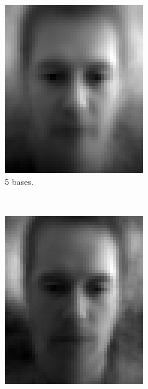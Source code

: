 \documentclass[a4paper, 10pt, conference]{ieeeconf}
\begin{document}
\begin{figure}[!ht]
\begin{subfigure}{0.1\textwidth}
          \includegraphics[width=\textwidth]{src/reface21.png}
          \caption{5 bases.}
        \end{subfigure}
        ~
        \begin{subfigure}{0.1\textwidth}
          \includegraphics[width=\textwidth]{src/reface22.png}

\end{subfigure}
\end{figure}
\end{document}
